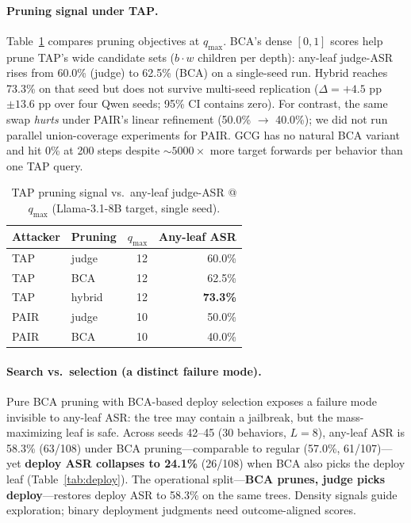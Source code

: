 \documentclass{article}
\newcommand{\BCA}{\textsc{BCA}}
\newcommand{\ASR}{\textsc{ASR}}
\begin{document}
\paragraph{Pruning signal under \textsc{TAP}.}
Table~\ref{tab:tap} compares pruning objectives at $q_{\max}$.
\BCA{}'s dense $[0,1]$ scores help prune \textsc{TAP}'s wide candidate sets ($b{\cdot}w$ children per depth): any-leaf judge-\ASR{} rises from 60.0\% (judge) to 62.5\% (\BCA{}) on a single-seed run.
Hybrid reaches 73.3\% on that seed but does not survive multi-seed replication ($\Delta{=}+4.5$ pp $\pm 13.6$ pp over four Qwen seeds; 95\% CI contains zero).
For contrast, the same swap \emph{hurts} under PAIR's linear refinement (50.0\% $\to$ 40.0\%); we did not run parallel union-coverage experiments for PAIR.
GCG has no natural \BCA{} variant and hit 0\% at 200 steps despite ${\sim}5000\times$ more target forwards per behavior than one \textsc{TAP} query.

\begin{table}[t]
\centering
\small
\caption{\textsc{TAP} pruning signal vs.\ any-leaf judge-\ASR{} @ $q_{\max}$ (Llama-3.1-8B target, single seed).}
\label{tab:tap}
\begin{tabular}{llrr}
\toprule
Attacker & Pruning & $q_{\max}$ & Any-leaf \ASR{} \\
\midrule
\textsc{TAP} & judge & 12 & 60.0\% \\
\textsc{TAP} & \BCA{} & 12 & 62.5\% \\
\textsc{TAP} & hybrid & 12 & \textbf{73.3\%} \\
\midrule
PAIR & judge & 10 & 50.0\% \\
PAIR & \BCA{} & 10 & 40.0\% \\
\bottomrule
\end{tabular}
\end{table}

\paragraph{Search vs.\ selection (a distinct failure mode).}
Pure \BCA{} pruning with \BCA{}-based deploy selection exposes a failure mode invisible to any-leaf \ASR{}: the tree may contain a jailbreak, but the mass-maximizing leaf is safe.
Across seeds 42--45 (30 behaviors, $L{=}8$), any-leaf \ASR{} is 58.3\% (63/108) under \BCA{} pruning---comparable to regular (57.0\%, 61/107)---yet \textbf{deploy \ASR{} collapses to 24.1\%} (26/108) when \BCA{} also picks the deploy leaf (Table~\ref{tab:deploy}).
The operational split---\textbf{\BCA{} prunes, judge picks deploy}---restores deploy \ASR{} to 58.3\% on the same trees.
Density signals guide exploration; binary deployment judgments need outcome-aligned scores.
\end{document}
